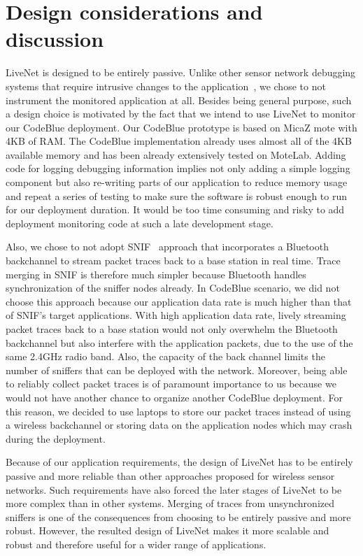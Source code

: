 \section{Design considerations and discussion}

LiveNet is designed to be entirely passive. Unlike other sensor network
debugging systems that require intrusive changes to the
application~\cite{sympathy,snms-ewsn05,rost2006memento,envirolog}, we chose to
not instrument the monitored application at all. Besides being general purpose, such
a design choice is motivated by the fact that we intend to use LiveNet to monitor
our CodeBlue deployment. Our CodeBlue prototype is based on MicaZ mote with
4KB of RAM. The CodeBlue implementation already uses almost all of the 4KB
available memory and has been already extensively tested on MoteLab. Adding
code for logging debugging information implies not only adding a simple
logging component but also re-writing parts of our application to reduce
memory usage and repeat a series of testing to make sure the software is
robust enough to run for our deployment duration. It would be too time
consuming and risky to add deployment monitoring code at such a late
development stage.

Also, we chose to not adopt SNIF~\cite{snif-demo-ewsn07} approach that
incorporates a Bluetooth backchannel to stream packet traces back to a base
station in real time. Trace merging in SNIF is therefore much simpler because
Bluetooth handles synchronization of the sniffer nodes already. In CodeBlue
scenario, we did not choose this approach because our application data rate is
much higher than that of SNIF's target applications. With high application
data rate, lively streaming packet traces back to a base station would not
only overwhelm the Bluetooth backchannel but also interfere with the
application packets, due to the use of the same 2.4GHz radio band. Also, the
capacity of the back channel limits the number of sniffers that can be
deployed with the network.  Moreover, being able to reliably collect packet
traces is of paramount importance to us because we would not have another
chance to organize another CodeBlue deployment. For this reason, we decided to
use laptops to store our packet traces instead of using a wireless backchannel or
storing data on the application nodes which may crash during the deployment.

Because of our application requirements, the design of LiveNet has to be
entirely passive and more reliable than other approaches proposed for wireless
sensor networks. Such requirements have also forced the later stages of LiveNet to
be more complex than in other systems. Merging of traces from unsynchronized
sniffers is one of the consequences from choosing to be entirely passive and
more robust. However, the resulted design of LiveNet makes it more scalable
and robust and therefore useful for a wider range of applications.

